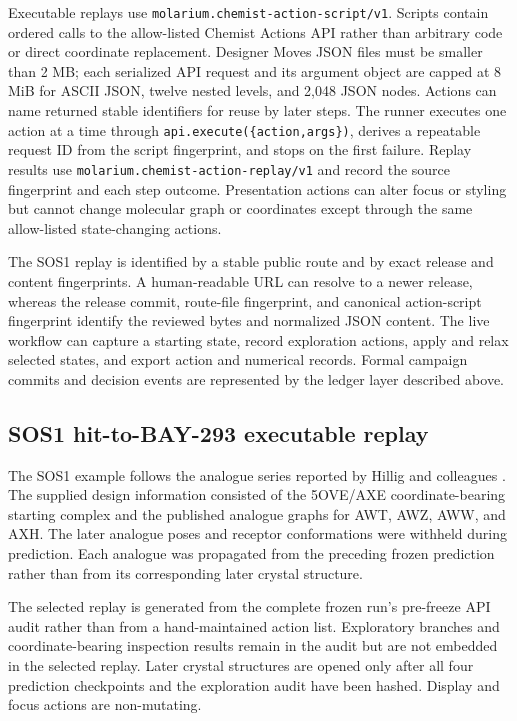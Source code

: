 \documentclass[11pt]{article}
\begin{document}
\begin{small}
Executable replays use \texttt{molarium.chemist-action-script/v1}. Scripts contain ordered calls to the allow-listed Chemist Actions API rather than arbitrary code or direct coordinate replacement. Designer Moves JSON files must be smaller than 2 MB; each serialized API request and its argument object are capped at 8 MiB for ASCII JSON, twelve nested levels, and 2,048 JSON nodes. Actions can name returned stable identifiers for reuse by later steps. The runner executes one action at a time through \texttt{api.execute(\{action,args\})}, derives a repeatable request ID from the script fingerprint, and stops on the first failure. Replay results use \texttt{molarium.chemist-action-replay/v1} and record the source fingerprint and each step outcome. Presentation actions can alter focus or styling but cannot change molecular graph or coordinates except through the same allow-listed state-changing actions.

The SOS1 replay is identified by a stable public route and by exact release and content fingerprints. A human-readable URL can resolve to a newer release, whereas the release commit, route-file fingerprint, and canonical action-script fingerprint identify the reviewed bytes and normalized JSON content. The live workflow can capture a starting state, record exploration actions, apply and relax selected states, and export action and numerical records. Formal campaign commits and decision events are represented by the ledger layer described above.

\subsection{SOS1 hit-to-BAY-293 executable replay}

The SOS1 example follows the analogue series reported by Hillig and colleagues \citep{hillig2019sos1}. The supplied design information consisted of the 5OVE/AXE coordinate-bearing starting complex and the published analogue graphs for AWT, AWZ, AWW, and AXH. The later analogue poses and receptor conformations were withheld during prediction. Each analogue was propagated from the preceding frozen prediction rather than from its corresponding later crystal structure.

The selected replay is generated from the complete frozen run's pre-freeze API audit rather than from a hand-maintained action list. Exploratory branches and coordinate-bearing inspection results remain in the audit but are not embedded in the selected replay. Later crystal structures are opened only after all four prediction checkpoints and the exploration audit have been hashed. Display and focus actions are non-mutating.


\end{small}
\end{document}
